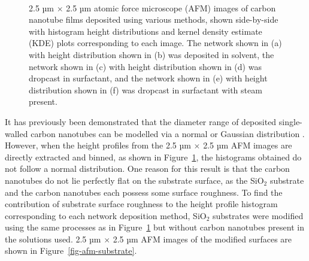 \documentclass[
  a4paper,
]{scrbook}
\begin{document}
\begin{figure}
\begin{minipage}[t]{0.45\linewidth}
{{}

}

\end{minipage}%
%
\begin{minipage}[t]{0.01\linewidth}

{\centering 

~

}

\end{minipage}%

\caption[Atomic force microscope images of carbon nanotube films
deposited using various methods, shown side-by-side with histogram
height distributions and kernel density estimate (KDE) plots
corresponding to each image.]{\label{fig-afm-morphology}2.5 µm
\(\times\) 2.5 µm atomic force microscope (AFM) images of carbon
nanotube films deposited using various methods, shown side-by-side with
histogram height distributions and kernel density estimate (KDE) plots
corresponding to each image. The network shown in (a) with height
distribution shown in (b) was deposited in solvent, the network shown in
(c) with height distribution shown in (d) was dropcast in surfactant,
and the network shown in (e) with height distribution shown in (f) was
dropcast in surfactant with steam present.}

\end{figure}

It has previously been demonstrated that the diameter range of deposited
single-walled carbon nanotubes can be modelled via a normal or Gaussian
distribution \autocite{LeMieux2008,Liu2013,Vobornik2023}. However, when
the height profiles from the 2.5 µm \(\times\) 2.5 µm AFM images are
directly extracted and binned, as shown in
Figure~\ref{fig-afm-morphology}, the histograms obtained do not follow a
normal distribution. One reason for this result is that the carbon
nanotubes do not lie perfectly flat on the substrate surface, as the
SiO\(_2\) substrate and the carbon nanotubes each possess some surface
roughness. To find the contribution of substrate surface roughness to
the height profile histogram corresponding to each network deposition
method, SiO\(_2\) substrates were modified using the same processes as
in Figure~\ref{fig-afm-morphology} but without carbon nanotubes present
in the solutions used. 2.5 µm \(\times\) 2.5 µm AFM images of the
modified surfaces are shown in Figure~\ref{fig-afm-substrate}.
\end{document}
